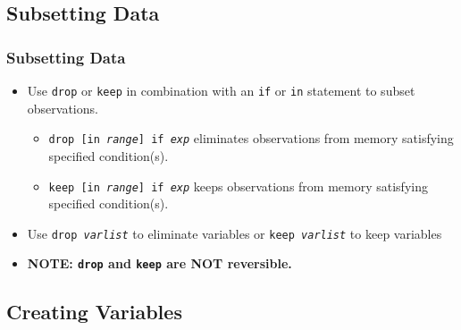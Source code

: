 \documentclass{beamer}
\begin{document}
\subsection{Subsetting Data}

\begin{frame}
	\frametitle{Subsetting Data}
		\begin{itemize}
			\item Use \texttt{drop} or \texttt{keep} in combination with an \texttt{if} or \texttt{in} statement to subset observations.
				\begin{itemize}
					\item \texttt{drop [in \textit{range}] if \textit{exp}} eliminates observations from memory satisfying specified condition(s).
					\item \texttt{keep [in \textit{range}] if \textit{exp}} keeps observations from memory satisfying specified condition(s).
				\end{itemize}
			\item Use \texttt{drop \textit{varlist}} to eliminate variables or \texttt{keep \textit{varlist}} to keep variables
			\item \textbf{NOTE: \texttt{drop} and \texttt{keep} are NOT reversible.}
		\end{itemize}
\end{frame}

\subsection{Creating Variables}
\end{document}
